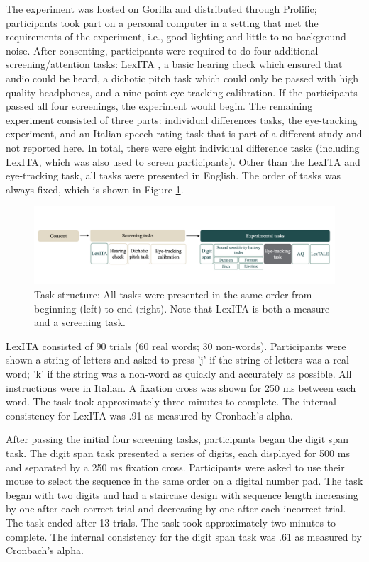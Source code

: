 The experiment was hosted on Gorilla and distributed through Prolific; participants took part on a personal computer in a setting that met the requirements of the experiment, i.e., good lighting and little to no background noise. After consenting, participants were required to do four additional screening/attention tasks: LexITA \cite{Amenta2021}, a basic hearing check which ensured that audio could be heard, a dichotic pitch task \citep{milne_2021} which could only be passed with high quality headphones, and a nine-point eye-tracking calibration. If the participants passed all four screenings, the experiment would begin. The remaining experiment consisted of three parts: individual differences tasks, the eye-tracking experiment, and an Italian speech rating task that is part of a different study and not reported here. In total, there were eight individual difference tasks (including LexITA, which was also used to screen participants). Other than the LexITA and eye-tracking task, all tasks were presented in English. The order of tasks was always fixed, which is shown in Figure \ref{fig:task_structure}. 

\begin{figure}[H]
  \centering
  \includegraphics[width=1\linewidth]{visuals/task_structure.jpg}
  \caption{Task structure: All tasks were presented in the same order from beginning (left) to end (right). Note that LexITA is both a measure and a screening task.}
  \label{fig:task_structure}
\end{figure}

LexITA \citep{Amenta2021} consisted of 90 trials (60 real words; 30 non-words). Participants were shown a string of letters and asked to press 'j' if the string of letters was a real word; 'k' if the string was a non-word as quickly and accurately as possible. All instructions were in Italian. A fixation cross was shown for 250 ms between each word. The task took approximately three minutes to complete. The internal consistency for LexITA was .91 as measured by Cronbach's alpha.

After passing the initial four screening tasks, participants began the digit span task. The digit span task presented a series of digits, each displayed for 500 ms and separated by a 250 ms fixation cross. Participants were asked to use their mouse to select the sequence in the same order on a digital number pad. The task began with two digits and had a staircase design with sequence length increasing by one after each correct trial and decreasing by one after each incorrect trial. The task ended after 13 trials. The task took approximately two minutes to complete. The internal consistency for the digit span task was .61 as measured by Cronbach's alpha.

